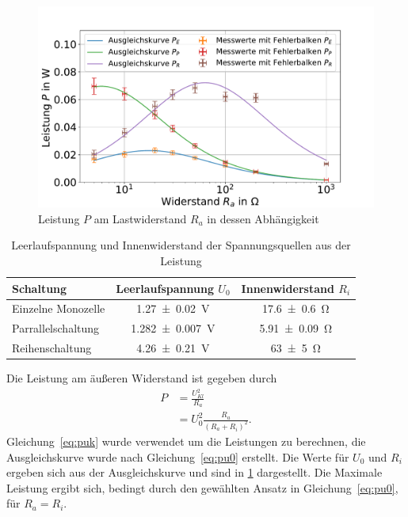 \FloatBarrier

\begin{figure}[h]
	\centering
	\includegraphics[width=0.9\linewidth]{"auswertung/Auswertung Innenwiderstand/Batterie Gesamt P"}
	\caption{Leistung $P$ am Lastwiderstand $R_a$ in dessen Abhängigkeit}
	\label{fig:batt-ges-p}
\end{figure}



\begin{table}
	\caption{Leerlaufspannung und Innenwiderstand der Spannungsquellen aus der Leistung}
	\centering
	\begin{tabular}{|l||c|c|}
		\hline 
		Schaltung & Leerlaufspannung $U_0$ & Innenwiderstand $R_i$ \\ 
		\hline \hline
		Einzelne Monozelle	& \SI{1.27+-0.02}{V}  & \SI{17.6+-0.6}{\ohm } \\ 
		\hline  
		Parrallelschaltung	& \SI{1.282+-0.007}{V } &\SI{5.91+-0.09}{\ohm }  \\ 
		\hline   
		Reihenschaltung	& \SI{4.26+-0.21}{V } &\SI{63+-5}{\ohm }  \\ 
		\hline 
	\end{tabular} 
	
	\label{tab:batt-U-P}
	
\end{table}


Die Leistung am äußeren Widerstand ist gegeben durch 
\begin{align}
 P &=\frac{U_{Kl}^2}{R_a} \label{eq:puk}\\
 &= U_0^2 \frac{R_a}{(R_a+R_i)^2} \label{eq:pu0}.
\end{align} 
Gleichung~\ref{eq:puk} wurde verwendet um die Leistungen zu berechnen, die Ausgleichskurve wurde nach Gleichung~\ref{eq:pu0} erstellt.
Die Werte für $U_0$ und $R_i$ ergeben sich aus der Ausgleichskurve und sind in \cref{tab:batt-U-P} dargestellt. Die Maximale Leistung ergibt sich, bedingt durch den gewählten Ansatz in Gleichung~\ref{eq:pu0}, für $R_a=R_i$.\\







